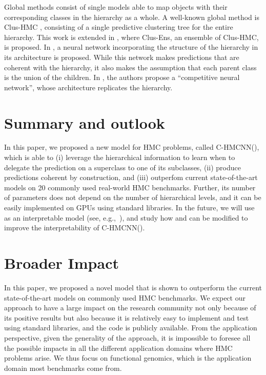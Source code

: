 \documentclass{article}
\newcommand{\module}{\text{MCM}}
\newcommand{\loss}{\text{MCLoss}}
\newcommand{\system}[1]{C-HMCNN(#1)}
\newcommand{\ens}{{Clus-Ens}}
\begin{document}
Global methods consist of single models able to map objects with their corresponding classes in the hierarchy as a whole. A well-known global method is {\sc Clus-HMC} \citep{vens2008}, consisting of a single predictive clustering tree for the entire hierarchy. This work is extended in \citep{schietgat2010}, where \ens{}, an ensemble of {\sc Clus-HMC}, is proposed. In \cite{masera2018}, a neural network incorporating the structure of the hierarchy in its architecture is proposed. While this network makes predictions that are coherent with the hierarchy, it also makes the assumption that each parent class is the union of the children. In \cite{borges2012}, the authors propose a ``competitive neural network'', whose architecture replicates the hierarchy.





\section{Summary and outlook}\label{sec:conclusions}


In this paper, we proposed a new model for HMC problems, called \system{}, which is able to (i) leverage the hierarchical information to learn when to delegate the prediction on a superclass to one of its subclasses, (ii) produce predictions coherent by construction, and (iii) outperfom current state-of-the-art models on 20 commonly used real-world HMC benchmarks. Further, its number of parameters does not depend on the number of hierarchical levels, and it can be easily implemented on GPUs using standard libraries. In the future, we will use as  an interpretable model (see, e.g.,~\cite{lei2016}), and study how \module{} and \loss{} can be modified to improve the interpretability of \system{}.







\section*{Broader Impact}



In this paper, we proposed a novel model that is shown to outperform the current state-of-the-art models on commonly used HMC benchmarks. We expect our approach to have a large impact on the research community not only because of its positive results but also because it is relatively easy to implement and test using standard libraries, and the code is publicly available. From the application perspective, given the generality of the approach, it is impossible to foresee all the possible impacts in all the different application domains where HMC problems arise.  We thus focus on functional genomics, which is the application domain most benchmarks come from. 
\end{document}
